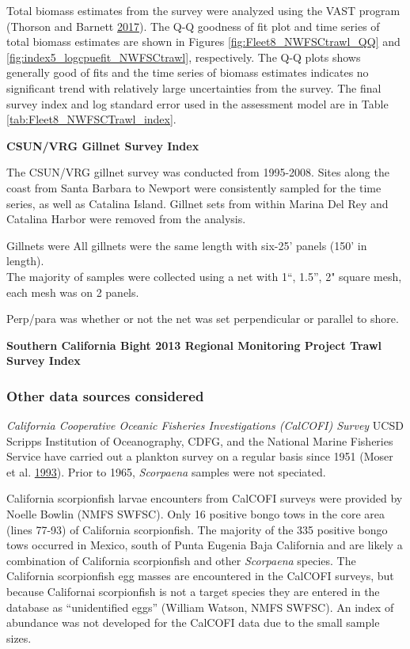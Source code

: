 \documentclass[12pt,]{article}
\begin{document}
Total biomass estimates from the survey were analyzed using the VAST
program (Thorson and Barnett \protect\hyperlink{ref-Thorson2017}{2017}).
The Q-Q goodness of fit plot and time series of total biomass estimates
are shown in Figures \ref{fig:Fleet8_NWFSCtrawl_QQ} and
\ref{fig:index5_logcpuefit_NWFSCtrawl}, respectively. The Q-Q plots
shows generally good of fits and the time series of biomass estimates
indicates no significant trend with relatively large uncertainties from
the survey. The final survey index and log standard error used in the
assessment model are in Table \ref{tab:Fleet8_NWFSCTrawl_index}.

\textbf{CSUN/VRG Gillnet Survey Index}

The CSUN/VRG gillnet survey was conducted from 1995-2008. Sites along
the coast from Santa Barbara to Newport were consistently sampled for
the time series, as well as Catalina Island. Gillnet sets from within
Marina Del Rey and Catalina Harbor were removed from the analysis.

Gillnets were All gillnets were the same length with six-25' panels
(150' in length).\\
The majority of samples were collected using a net with 1``, 1.5'', 2"
square mesh, each mesh was on 2 panels.

Perp/para was whether or not the net was set perpendicular or parallel
to shore.

\textbf{Southern California Bight 2013 Regional Monitoring Project Trawl
Survey Index}

\subsubsection{Other data sources
considered}\label{other-data-sources-considered}

\emph{California Cooperative Oceanic Fisheries Investigations (CalCOFI)
Survey} UCSD Scripps Institution of Oceanography, CDFG, and the National
Marine Fisheries Service have carried out a plankton survey on a regular
basis since 1951 (Moser et al. \protect\hyperlink{ref-Moser1993}{1993}).
Prior to 1965, \emph{Scorpaena} samples were not speciated.

California scorpionfish larvae encounters from CalCOFI surveys were
provided by Noelle Bowlin (NMFS SWFSC). Only 16 positive bongo tows in
the core area (lines 77-93) of California scorpionfish. The majority of
the 335 positive bongo tows occurred in Mexico, south of Punta Eugenia
Baja California and are likely a combination of California scorpionfish
and other \emph{Scorpaena} species. The California scorpionfish egg
masses are encountered in the CalCOFI surveys, but because Californai
scorpionfish is not a target species they are entered in the database as
``unidentified eggs'' (William Watson, NMFS SWFSC). An index of
abundance was not developed for the CalCOFI data due to the small sample
sizes.
\end{document}
